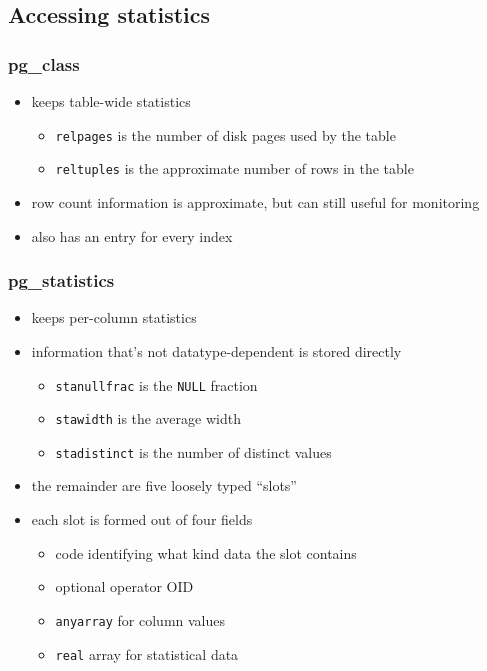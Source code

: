 \documentclass{beamer}
\begin{document}
\subsection{Accessing statistics}

\begin{frame}
  \frametitle{pg\_class}

  \begin{itemize}
  \item keeps \alert{table-wide} statistics
    \begin{itemize}
    \item \texttt{relpages} is the number of \alert{disk pages} used by the table
    \item \texttt{reltuples} is the approximate number of \alert{rows} in the table
    \end{itemize}
  \item row count information is \alert{approximate}, but can still useful for monitoring
  \item also has an entry for \alert{every index}
  \end{itemize}
\end{frame}

\begin{frame}
  \frametitle{pg\_statistics}

  \begin{itemize}
  \item keeps \alert{per-column} statistics
  \item information that's not \alert{datatype-dependent} is stored directly
    \begin{itemize}
    \item \texttt{stanullfrac} is the \texttt{NULL} fraction
    \item \texttt{stawidth} is the average width
    \item \texttt{stadistinct} is the number of distinct values
    \end{itemize}
  \item the remainder are five \alert{loosely typed} ``slots''
  \item each slot is formed out of \alert{four fields}
    \begin{itemize}
    \item \alert{code} identifying what kind data the slot contains
    \item optional \alert{operator OID}
    \item \texttt{anyarray} for \alert{column values}
    \item \texttt{real} array for \alert{statistical data}
    \end{itemize}
  \end{itemize}
\end{frame}
\end{document}

